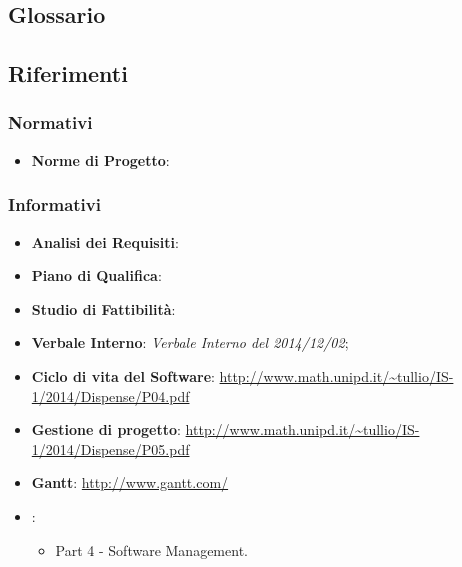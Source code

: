 	\subsection{Glossario}
		\glossarioDesc
		
	\subsection{Riferimenti}
		\subsubsection{Normativi}
			\begin{itemize}
				\item \textbf{Norme di Progetto}: \docNameVersionNdP
			\end{itemize}	
		\subsubsection{Informativi}
			\begin{itemize}
				\item \textbf{Analisi dei Requisiti}: \docNameVersionAdR
				\item \textbf{Piano di Qualifica}: \docNameVersionPdQ
				\item \textbf{Studio di Fattibilità}: \docNameVersionSdF
				\item \textbf{Verbale Interno}: \emph{Verbale Interno del 2014/12/02};
				\item \textbf{Ciclo di vita del Software}: \url{http://www.math.unipd.it/~tullio/IS-1/2014/Dispense/P04.pdf}
				\item \textbf{Gestione di progetto}: \url{http://www.math.unipd.it/~tullio/IS-1/2014/Dispense/P05.pdf}
				\item \textbf{Gantt}: \url{http://www.gantt.com/}
				\item \textbf{\sommerville}:
					\begin{itemize}
						\item Part 4 - Software Management.					
					\end{itemize}
			\end{itemize}
			
